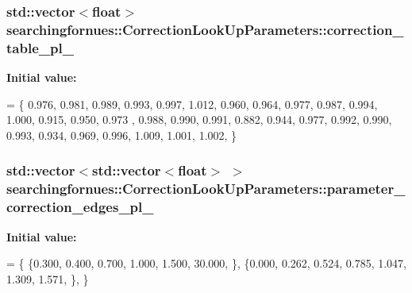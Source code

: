 \subsubsection[{\texorpdfstring{correction\+\_\+table\+\_\+pl\+\_\+2}{correction_table_pl_2}}]{\setlength{\rightskip}{0pt plus 5cm}std\+::vector$<$float$>$ searchingfornues\+::\+Correction\+Look\+Up\+Parameters\+::correction\+\_\+table\+\_\+pl\+\_}\hypertarget{structsearchingfornues_1_1CorrectionLookUpParameters_abbee5a3fe043af403a139e02804189a6}{}\label{structsearchingfornues_1_1CorrectionLookUpParameters_abbee5a3fe043af403a139e02804189a6}
{\bfseries Initial value\+:}
\begin{DoxyCode}
= \{
    0.976, 0.981, 0.989, 0.993, 0.997, 1.012, 0.960, 0.964, 0.977, 0.987, 0.994, 1.000, 0.915, 0.950, 0.973
      , 0.988, 0.990, 0.991, 0.882, 0.944,
    0.977, 0.992, 0.990, 0.993, 0.934, 0.969, 0.996, 1.009, 1.001, 1.002,
    \}
\end{DoxyCode}
\subsubsection[{\texorpdfstring{parameter\+\_\+correction\+\_\+edges\+\_\+pl\+\_\+0}{parameter_correction_edges_pl_0}}]{\setlength{\rightskip}{0pt plus 5cm}std\+::vector$<$std\+::vector$<$float$>$ $>$ searchingfornues\+::\+Correction\+Look\+Up\+Parameters\+::parameter\+\_\+correction\+\_\+edges\+\_\+pl\+\_}\hypertarget{structsearchingfornues_1_1CorrectionLookUpParameters_a3c10163ada393f141641bb88ad843979}{}\label{structsearchingfornues_1_1CorrectionLookUpParameters_a3c10163ada393f141641bb88ad843979}
{\bfseries Initial value\+:}
\begin{DoxyCode}
= \{
    \{0.300, 0.400, 0.700, 1.000, 1.500, 30.000, \},
    \{0.000, 0.262, 0.524, 0.785, 1.047, 1.309, 1.571, \},
    \}
\end{DoxyCode}
